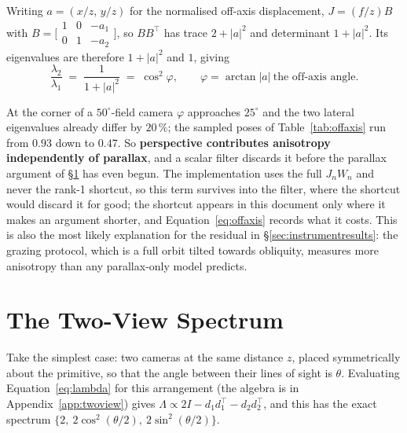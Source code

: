 Writing $a = (x/z,\,y/z)$ for the normalised off-axis displacement,
$J = (f/z)B$ with $B = \big[\begin{smallmatrix}1&0&-a_1\\0&1&-a_2\end{smallmatrix}\big]$,
so $BB^{\!\top}$ has trace $2+|a|^2$ and determinant $1+|a|^2$. Its eigenvalues
are therefore $1+|a|^2$ and $1$, giving
\begin{equation}
  \frac{\lambda_2}{\lambda_1} \;=\; \frac{1}{1+|a|^2} \;=\; \cos^2\varphi,
  \qquad \varphi = \arctan|a| \ \text{the off-axis angle.}
  \label{eq:offaxis}
\end{equation}



At the corner of a $50^\circ$-field camera $\varphi$ approaches $25^\circ$ and
the two lateral eigenvalues already differ by $20\,\%$; the sampled poses of
Table~\ref{tab:offaxis} run from $0.93$ down to $0.47$. So \textbf{perspective
contributes anisotropy independently of parallax}, and a scalar filter discards
it before the parallax argument of \S\ref{sec:anisotropy} has even begun. The
implementation uses the full $J_nW_n$ and never the rank-1 shortcut, so this term survives into the filter, where the shortcut would discard it for
good; the shortcut appears in this document
only where it makes an argument shorter, and Equation~\eqref{eq:offaxis} records
what it costs. This is also the most likely explanation for the residual in
\S\ref{sec:instrumentresults}: the grazing protocol, which is a full orbit tilted
towards obliquity, measures more anisotropy than any parallax-only model
predicts.

\section{The Two-View Spectrum}
\label{sec:anisotropy}
Take the simplest case: two cameras at the same distance $z$, placed symmetrically about the primitive, so that the angle
between their lines of sight is $\theta$. Evaluating
Equation~\eqref{eq:lambda} for this arrangement (the algebra is in
Appendix~\ref{app:twoview}) gives $\Lambda \propto 2I - d_1d_1^{\!\top} -
d_2d_2^{\!\top}$, and this has the exact spectrum
$\{2,\ 2\cos^2(\theta/2),\ 2\sin^2(\theta/2)\}$.

